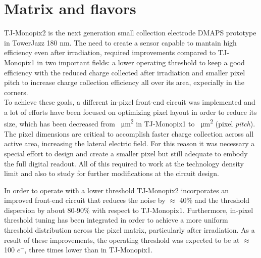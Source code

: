 
\section{Matrix and flavors}


TJ-Monopix2 is the next generation small collection electrode DMAPS prototype in TowerJazz 180 nm. The need to create a sensor capable to mantain high efficiency even after irradiation, required improvements compared to TJ-Monopix1 in two important fields: a lower operating threshold to keep a good efficiency with the reduced charge collected after irradiation and smaller pixel pitch to increase charge collection efficiency all over its area, expecially in the corners.\\

To achieve these goals, a different in-pixel front-end circuit was implemented and a lot of efforts have been focused on optimizing pixel layout in order to reduce its size, which has been decreased from ~\unit{\micro m^{2}} in TJ-Monopix1 to ~\unit{\micro m^{2}} (pixel \textit{pitch}). The pixel dimensions are critical to accomplish faster charge collection across all active area, increasing the lateral electric field. For this reason it was necessary a special effort to design and create a smaller pixel but still adequate to embody the full digital readout. All of this required to work at the technology density limit and also to study for further modifications at the circuit design.

In order to operate with a lower threshold TJ-Monopix2 incorporates an improved front-end circuit that reduces the noise by $\approx$ 40\% and the threshold dispersion by about 80-90\% with respect to TJ-Monopix1. Furthermore, in-pixel threshold tuning has been integrated in order to achieve a more uniform threshold distribution across the pixel matrix, particularly after irradiation. As a result of these improvements, the operating threshold was expected to be at $\approx$ 100 $e^{-}$, three times lower than in TJ-Monopix1.





